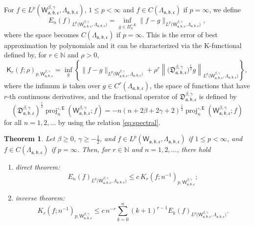 \documentclass{amsart}
\newtheorem{thm}{Theorem}[section]
\theoremstyle{remark}
\def\sE{{\mathsf E}}
\def\sK{{\mathsf K}}
\def\sW{{\mathsf W}}
\def\fa{{\mathfrak a}}
\def\fb{{\mathfrak b}}
\def\fc{{\mathfrak c}}
\def\fD{{\mathfrak D}}
\def\b{{\beta}}
\def\g{{\gamma}}
\def\NN{{\mathbb N}}
\def\proj{\operatorname{proj}}
\def\f{\frac}
\begin{document}
For $f \in L^p(\sW_{\fa, \fb, \fc}^{\b,\g},\Lambda_{\fa, \fb, \fc})$, $1 \le p < \infty$ and $f \in C(\Lambda_{\fa, \fb,\fc})$
if $p = \infty$, we define 
$$
   E_n(f)_{L^p\big(\sW_{\fa, \fb, \fc}^{\b,\g},\Lambda_{\fa, \fb, \fc}\big)} 
         = \inf_{g \in\Pi_n^{\circ,\sE}} \|f - g\|_{L^p\big(\sW_{\fa, \fb, \fc}^{\b,\g},\Lambda_{\fa, \fb, \fc}\big)},
$$
where the space becomes $C(\Lambda_{\fa,\fb,\fc})$ if $p = \infty$. This is the error of best approximation by polynomials 
and it can be characterized via the K-functional defined by, for $r \in \NN$ and $\rho > 0$,  
$$
\sK_r(f; \rho)_{p,\sW_{\fa,\fb,\fc}^{\b,\g}} = \inf_{g} \left\{ \|f - g\|_{L^p\big(\sW_{\fa, \fb, \fc}^{\b,\g},\Lambda_{\fa, \fb, \fc}\big)} + 
  \rho^r \left \|\big (\fD_{\fa,\fb,\fc}^{\b,\g}\big )^\f r 2 g \right\|_{L^p\big(\sW_{\fa, \fb, \fc}^{\b,\g},\Lambda_{\fa, \fb, \fc}\big)} \right \}, 
$$
where the infimum is taken over $g \in C^r(\Lambda_{\fa,\fb,\fc})$, the space of functions that have $r$-th continuous 
derivatives, and the fractional operator of $\fD_{\fa,\fb,\fc}^{\b,\g}$ is defined by
$$
  (\fD_{\fa,\fb,\fc}^{\b,\g})^{\f r 2} \proj_n^{\circ, \sE}(\sW_{\fa,\fb,\fc}^{\b,\g}; f) = -n (n+2 \b+2\g+2)^{\f12} 
      \proj_n^{\circ, \sE}(\sW_{\fa,\fb,\fc}^{\b,\g}; f)
$$
for all $n =1,2,\ldots$ by using the relation \eqref{eq:spectral}. 

\begin{thm}\label{main-thmV0}
Let $\b \ge 0$, $\g \ge - \f12$, and $f \in L^p(\sW_{\fa,\fb,\fc}, \Lambda_{\fa,\fb,\fc})$ if $1 \le p < \infty$, 
and $f \in C(\Lambda_{\fa,\fb,\fc})$ if $p = \infty$. Then, for $r \in \NN$ and $n =1,2,\ldots$, there hold 
\begin{enumerate} [\rm (i)]
\item {\it direct theorem}:
$$
    E_n(f)_{L^p\big(\sW_{\fa, \fb, \fc}^{\b,\g},\Lambda_{\fa, \fb, \fc}\big)} 
        \le c \, K_r(f;  n^{-1})_{p,\sW_{\fa, \fb, \fc}^{\b,\g}} ;
$$
\item {\it inverse theorem}:  
$$
   K_r(f; n^{-1})_{p,\sW_{\fa, \fb, \fc}^{\b,\g}} 
         \le c \,n^{-r} \sum_{k=0}^n (k+1)^{r-1} E_k(f)_{L^p\big(\sW_{\fa, \fb, \fc}^{\b,\g},\Lambda_{\fa, \fb, \fc}\big)}.
$$
\end{enumerate}
\end{thm}
\end{document}

